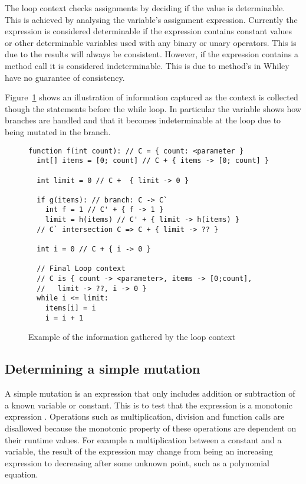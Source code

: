 The loop context checks assignments by deciding if the value is determinable.
This is achieved by analysing the variable's assignment expression.
Currently the expression is considered determinable if the expression contains constant
values or other determinable variables used with any binary or unary operators.
This is due to the results will always be consistent.
However, if the expression contains a method call it is considered indeterminable.
This is due to method's in Whiley have no guarantee of consistency.


Figure~\ref{lst:loop-context} shows an illustration of information captured as
the context is collected though the statements before the while loop.
In particular the variable  shows how branches are handled
and that it becomes indeterminable at the loop due to being mutated in the 
branch.

\begin{figure}[ht]
\begin{lstlisting}
function f(int count): // C = { count: <parameter }
  int[] items = [0; count] // C + { items -> [0; count] }

  int limit = 0 // C +  { limit -> 0 } 

  if g(items): // branch: C -> C`
    int f = 1 // C' + { f -> 1 }
    limit = h(items) // C' + { limit -> h(items) }
  // C` intersection C => C + { limit -> ?? }

  int i = 0 // C + { i -> 0 }

  // Final Loop context
  // C is { count -> <parameter>, items -> [0;count],
  //   limit -> ??, i -> 0 }
  while i <= limit:
    items[i] = i
    i = i + 1
\end{lstlisting}
\caption{Example of the information gathered by the loop context}
\label{lst:loop-context}
\end{figure}

\subsection{Determining a simple mutation}\label{s:simple-mut}


A simple mutation is an expression that only includes addition or subtraction
of a known variable or constant.
This is to test that the expression is a monotonic expression \cite{tanton2005encyclopedia}.
Operations such as multiplication, division and function calls are disallowed
because the monotonic property of these operations are dependent on their
runtime values.
For example a multiplication between a constant and a variable,
the result of the expression may change from being an increasing expression
to decreasing after some unknown point, such as a polynomial equation.

